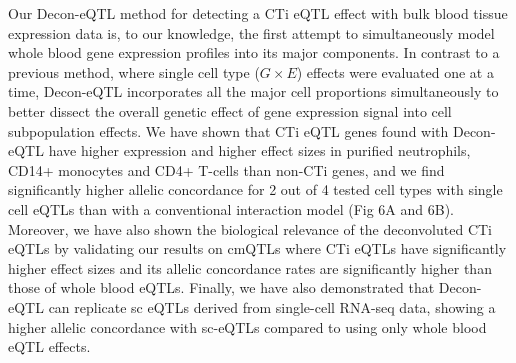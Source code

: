 Our Decon-eQTL method for detecting a CTi eQTL effect with bulk blood tissue expression data is, to our knowledge, the first attempt to simultaneously model whole blood gene expression profiles into its major components. In contrast to a previous method, where single cell type  ($G \times E$) effects were evaluated one at a time\cite{westraCellSpecificEQTL2015,glastonburyCellTypeHeterogeneityAdipose2019}, Decon-eQTL incorporates all the major cell proportions simultaneously to better dissect the overall genetic effect of gene expression signal into cell subpopulation effects. We have shown that CTi eQTL genes found with Decon-eQTL have higher expression and higher effect sizes in purified neutrophils, CD14+ monocytes and CD4+ T-cells than non-CTi genes, and we find significantly higher allelic concordance for 2 out of 4 tested cell types with single cell eQTLs than with a conventional interaction model (Fig 6A and 6B). Moreover, we have also shown the biological relevance of the deconvoluted CTi eQTLs by validating our results on cmQTLs where CTi eQTLs have significantly higher effect sizes and its allelic concordance rates are significantly higher than those of whole blood eQTLs.  Finally, we have also demonstrated that Decon-eQTL can replicate sc eQTLs derived from single-cell RNA-seq data, showing a higher allelic concordance with sc-eQTLs compared to using only whole blood eQTL effects.

